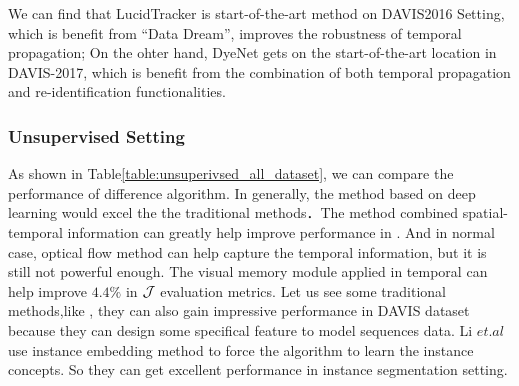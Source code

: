 We can find that LucidTracker\cite{LucidTracker} is start-of-the-art method on DAVIS2016 Setting, which is benefit from ``Data Dream'', improves the robustness of temporal propagation; On the ohter hand, DyeNet gets on the start-of-the-art location in DAVIS-2017, which is benefit from the combination of both temporal propagation and re-identification functionalities.

\subsubsection{Unsupervised Setting}
As shown in Table\ref{table:unsuperivsed_all_dataset}, we can compare the performance of difference algorithm. In generally, the method based on deep learning would excel the the traditional 
methods．The method combined spatial-temporal information can greatly help improve performance in \cite{Tokmakov2017Learning}. And in normal case, optical flow method can help capture the 
temporal information, but it is still not powerful enough. The visual memory module applied in temporal can help improve $4.4\%$ in $\mathcal{J}$ evaluation metrics. Let us see some traditional methods,like
\cite{Koh2017Primary,li2018instance}, they can also gain impressive performance in DAVIS dataset because they can design some specifical feature to model sequences data. Li $et.al$ use instance embedding method
to force the algorithm to learn the instance concepts. So they can get excellent performance in instance segmentation setting.


